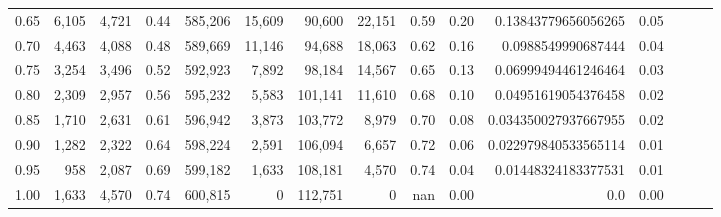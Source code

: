\begin{tabular}{rrrrrrrrrrrrrrr}
0.65 &    6,105 &  4,721 &  0.44 &  585,206 &   15,609 &   90,600 &   22,151 &  0.59 &  0.20 &   0.13843779656056265 &      0.05 \\
0.70 &    4,463 &  4,088 &  0.48 &  589,669 &   11,146 &   94,688 &   18,063 &  0.62 &  0.16 &    0.0988549990687444 &      0.04 \\
0.75 &    3,254 &  3,496 &  0.52 &  592,923 &    7,892 &   98,184 &   14,567 &  0.65 &  0.13 &   0.06999494461246464 &      0.03 \\
0.80 &    2,309 &  2,957 &  0.56 &  595,232 &    5,583 &  101,141 &   11,610 &  0.68 &  0.10 &   0.04951619054376458 &      0.02 \\
0.85 &    1,710 &  2,631 &  0.61 &  596,942 &    3,873 &  103,772 &    8,979 &  0.70 &  0.08 &  0.034350027937667955 &      0.02 \\
0.90 &    1,282 &  2,322 &  0.64 &  598,224 &    2,591 &  106,094 &    6,657 &  0.72 &  0.06 &  0.022979840533565114 &      0.01 \\
0.95 &      958 &  2,087 &  0.69 &  599,182 &    1,633 &  108,181 &    4,570 &  0.74 &  0.04 &   0.01448324183377531 &      0.01 \\
1.00 &    1,633 &  4,570 &  0.74 &  600,815 &        0 &  112,751 &        0 &   nan &  0.00 &                   0.0 &      0.00 \\
\bottomrule
\end{tabular}
